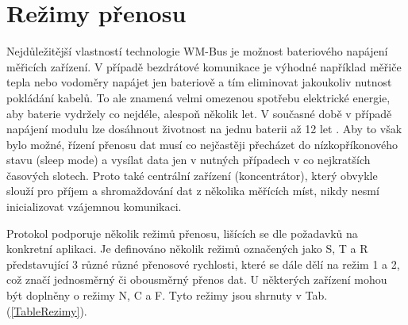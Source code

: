 \section{Režimy přenosu}
Nejdůležitější vlastností technologie WM-Bus je možnost bateriového napájení měřicích zařízení. V případě bezdrátové komunikace je výhodné například měřiče tepla nebo vodoměry napájet jen bateriově a tím eliminovat jakoukoliv nutnost pokládání kabelů. To ale znamená velmi omezenou spotřebu elektrické energie, aby baterie vydržely co nejdéle, alespoň několik let. V současné době v případě napájení modulu lze dosáhnout životnost na jednu baterii až 12 let \cite{WeptechCidlo}. Aby to však bylo možné, řízení přenosu dat musí co nejčastěji přecházet do nízkopříkonového stavu (sleep mode) a vysílat data jen v nutných případech v co nejkratších časových slotech. Proto také centrální zařízení (koncentrátor), který obvykle slouží pro příjem a shromaždování dat z několika měřících míst, nikdy nesmí inicializovat vzájemnou komunikaci.

Protokol podporuje několik režimů přenosu, lišících se dle požadavků na konkretní aplikaci. Je definováno několik režimů označených jako S, T a R představující 3 různé různé přenosové rychlosti, které se dále dělí na režim 1 a 2, což značí jednosměrný či obousměrný přenos dat. U některých zařízení mohou být doplněny o režimy N, C a F. Tyto režimy jsou shrnuty v Tab.(\ref{TableRezimy}).


